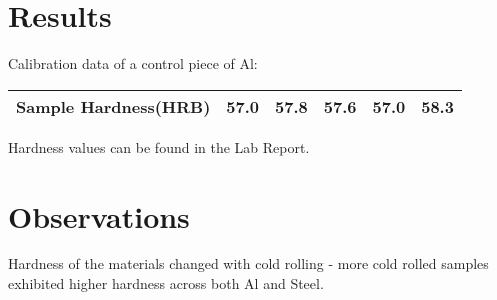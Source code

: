 \documentclass{article}
\begin{document}
\section{Results}

Calibration data of a control piece of Al:
\begin{table}[h]
\centering
\begin{tabular}{|| c | c | c | c | c | c ||}
\hline
Sample Hardness(HRB) & 57.0 & 57.8 & 57.6 & 57.0 & 58.3\\
\hline
\end{tabular}
\end{table}

Hardness values can be found in the Lab Report.
\section{Observations}

Hardness of the materials changed with cold rolling - more cold rolled samples exhibited higher hardness across both Al and Steel.
\end{document}
